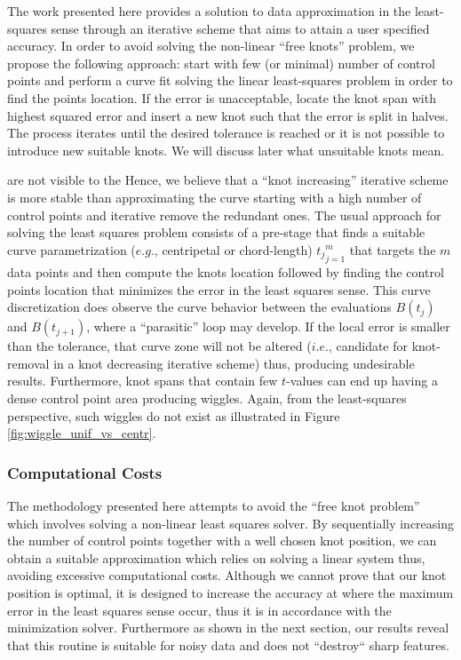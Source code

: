  The work presented here provides a solution to data approximation in the least-squares sense through an iterative 
 scheme that aims to attain a user specified accuracy. 
In order to avoid solving the non-linear ``free knots'' problem, we propose the following approach: start with few (or minimal) number of control points and perform a curve fit solving the linear least-squares problem in order to find 
the points location. If the error is unacceptable, locate the knot span with highest squared error and insert a  new knot such that the error is split in halves. The process iterates until the desired tolerance is reached or it is not 
possible to introduce new suitable knots. We will discuss later what unsuitable knots mean. 


 
 
 are not visible to the 
Hence, we believe that 
a ``knot increasing'' iterative scheme is more stable than approximating the curve starting with a high number of control points and iterative remove the redundant ones. 
The usual approach for solving the least squares problem consists of a pre-stage that finds a suitable curve parametrization ($e.g.$, centripetal or chord-length)  ${t_j}_{j=1}^m$ that targets the $m$ data points and
then compute the knots location followed by finding the control points location that minimizes the error in the least squares sense. 
This curve discretization does observe the curve behavior between the evaluations $B(t_j)$ and $B(t_{j+1})$, where a ``parasitic'' loop may develop. If the local error is smaller than the tolerance, that 
curve zone will not be altered ($i.e.$, candidate for knot-removal in a knot decreasing iterative scheme) thus, producing undesirable results. Furthermore, knot spans that contain few $t$-values can end up having a dense control point area 
producing wiggles. Again, from the least-squares perspective, such wiggles do not exist as illustrated in Figure \ref{fig:wiggle_unif_vs_centr}.



\subsubsection{Computational Costs}
The methodology presented here attempts to avoid the ``free knot problem'' which involves solving a non-linear 
least squares solver. By sequentially increasing the number of control points together with a well chosen knot 
position, we can obtain a suitable approximation which relies on solving a linear system thus, avoiding excessive 
computational costs. Although we cannot prove that our knot position is optimal, it is designed to increase the accuracy 
 at where the maximum error in the least squares sense occur,
  thus it is in accordance with the minimization solver. 
  Furthermore as shown in the next section, our results reveal that this routine is suitable for 
   noisy data and does not ``destroy`` sharp features. 
   
